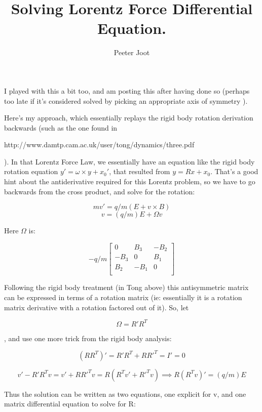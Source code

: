 \documentclass{article}      %
\title{Solving Lorentz Force Differential Equation.} %
\author{Peeter Joot}         %
\begin{document}

\maketitle{}

\section{}


I played with this a bit too, and am posting this after having done so (perhaps too late if it's considered solved by picking an appropriate axis of symmetry ).

Here's my approach, which essentially replays the rigid body rotation derivation backwards (such as the one found in 

http://www.damtp.cam.ac.uk/user/tong/dynamics/three.pdf

).  In that Lorentz Force Law, we essentially have an equation like the rigid body rotation equation $y' = \omega \times y + x_0'$, that resulted from $y = R x + x_0$.  That's a good hint about the antiderivative required for this Lorentz problem, so we have to go backwards from the cross product, and solve for the rotation:
 
\[
mv' = q/m ( E + v \times B )
\]
\[
v = (q/m) E + \Omega v
\]

Here $\Omega$ is:

\[
-q/m
\begin{bmatrix}
0 & B_3 & -B_2 \\
-B_3 & 0 & B_1 \\
B_2 & -B_1 & 0 \\
\end{bmatrix}
\]

Following the rigid body treatment (in Tong above) this antisymmetric matrix can be expressed in terms of a rotation matrix (ie: essentially it is a rotation matrix derivative with a rotation factored out of it).  So, let

\[
\Omega = R' R^T
\]

, and use one more trick from the rigid body analysis:

\[
(RR^T)' = R' R^T + R {R'}^T = I' = 0
\]

\[
v' - R' R^T v = v' + R {R'}^T v = R (R^T v' + {R'}^T v) 
\implies 
R (R^T v)' = (q/m) E
\]

Thus the solution can be written as two equations, one explicit for v, and one matrix differential equation to solve for R:
\end{document}
